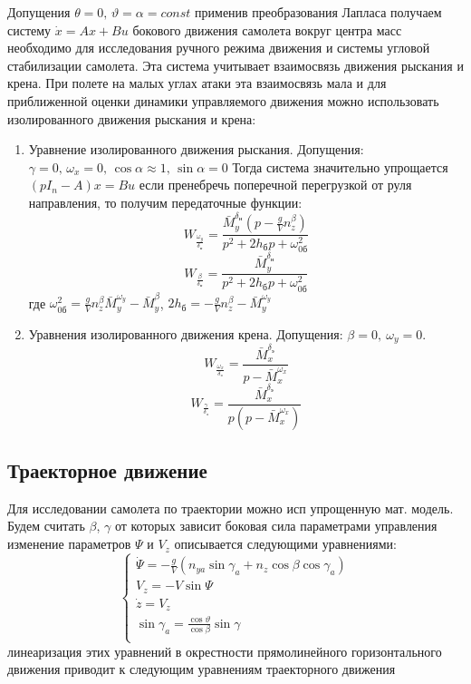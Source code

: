 \documentclass{article}
\begin{document}
Допущения $\theta = 0, \, \vartheta = \alpha = const$ применив преобразования
Лапласа получаем
систему $\dot{x} = Ax + Bu$ бокового движения самолета вокруг центра масс необходимо
для исследования ручного режима движения и системы угловой стабилизации
самолета. Эта система учитывает взаимосвязь движения рыскания и крена. При
полете на малых углах атаки эта взаимосвязь мала и для приближенной оценки
динамики управляемого движения можно использовать изолированного движения
рыскания и крена:
\begin{enumerate}
	\item Уравнение изолированного движения рыскания. Допущения: $\gamma = 0,
		      \, \omega_x = 0, \, \cos{\alpha} \approx 1,\,\sin{\alpha} = 0$
	      Тогда система значительно упрощается
	      $(pI_n - A)x = B u$
	      если пренебречь поперечной перегрузкой от руля направления, то
	      получим передаточные функции:
	      \[
		      W_{\frac{\omega_y}{\delta_\text{н}}}=
		      \frac{\bar{M}_y^{\delta_\text{н}} (p - \frac{g}{V}
		      n_z^\beta)}{p^2 + 2 h_\text{б}p + \omega^2_{0\text{б}}}
	      \]
	      \[
		      W_{\frac{\beta}{\delta_\text{н}}} =
              \frac{\bar{M}_y^{\delta_\text{н}}}{p^2 + 2 h_\text{б}p +
		      \omega^2_{0\text{б}}}
	      \]
	      где $\omega_{0\text{б}}^2 = \frac{g}{V} n_z^\beta
		      \bar{M}_y^{\omega_y} - \bar{M}_y^\beta$, $2h_\text{б} =
		      -\frac{g}{V} n_z^\beta - \bar{M}_y^{\omega_y}$
	\item Уравнения изолированного движения крена. Допущения: $\beta = 0,\
		      \omega_y = 0$.
	      \[
		      W_{\frac{\omega_x}{\delta_\text{э}}} =
		      \frac{\bar{M}_x^{\delta_\text{э}}}{p - \bar{M}_x^{\omega_x}}
	      \]
	      \[
		      W_{\frac{\gamma}{\delta_\text{э}}} =
		      \frac{\bar{M}_x^{\delta_\text{э}}}{p(p -
		      \bar{M}_x^{\omega_x})}
	      \]
\end{enumerate}
\newpage

\subsection{Траекторное движение}
Для исследовании самолета по траектории можно исп упрощенную мат. модель. Будем
считать $\beta$, $\gamma$ от которых зависит боковая сила параметрами
управления изменение параметров $\Psi$ и $V_z$ описывается следующими
уравнениями:
\begin{equation}
	\begin{cases}
		\dot{\Psi} = -\frac{g}{V}(n_{ya} \sin{\gamma_a} + n_z \cos{\beta}
		\cos{\gamma_a}) \\
		V_z = -V\sin{\Psi}
		\\
		\dot{z} = V_z
		\\

		\sin{\gamma_a} = \frac{\cos{\vartheta}}{\cos{\beta}} \sin{\gamma}
		\\
	\end{cases}
\end{equation}
линеаризация этих уравнений в окрестности прямолинейного горизонтального
движения приводит к следующим уравнениям траекторного движения
\end{document}

